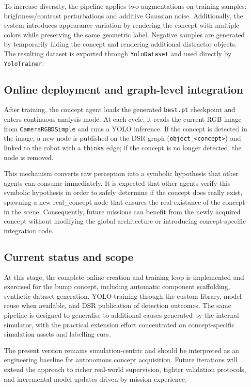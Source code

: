 \documentclass[a4paper, twoside]{article}
\begin{document}
To increase diversity, the pipeline applies two augmentations on training samples:
brightness/contrast perturbations and additive Gaussian noise.
Additionally, the system introduces appearance variation by rendering the concept with multiple colors while preserving the same geometric label.
Negative samples are generated by temporarily hiding the concept and rendering additional distractor objects.
The resulting dataset is exported through \texttt{YoloDataset} and used directly by \texttt{YoloTrainer}.

\subsection{Online deployment and graph-level integration}

After training, the concept agent loads the generated \texttt{best.pt} checkpoint and enters continuous analysis mode.
At each cycle, it reads the current RGB image from \texttt{CameraRGBDSimple} and runs a YOLO inference.
If the concept is detected in the image, a new node is published on the DSR graph (\texttt{object\_<concept>}) and linked to the robot with a \texttt{thinks} edge; if the concept is no longer detected, the node is removed.

This mechanism converts raw perception into a symbolic hypothesis that other agents can consume immediately. It is expected that other agents verify this symbolic hypothesis in order to safely determine if the concept does really exist, spawning a new real\_concept node that ensures the real existance of the concept in the scene.
Consequently, future missions can benefit from the newly acquired concept without modifying the global architecture or introducing concept-specific integration code.

\subsection{Current status and scope}

At this stage, the complete online creation and training loop is implemented and exercised for the bump concept, including automatic component scaffolding, synthetic dataset generation, YOLO training through the custom library, model reuse when available, and DSR publication of detection outcomes.
The same pipeline is designed to generalise to additional causes generated by the internal simulator, with the practical extension effort concentrated on concept-specific simulation assets and labelling cues.

The present version remains simulation-centric and should be interpreted as an engineering baseline for autonomous concept acquisition.
Future iterations will extend the approach to richer real-world supervision, tighter validation protocols, and incremental model updates driven by mission experience.




\printbibliography
\end{document}
